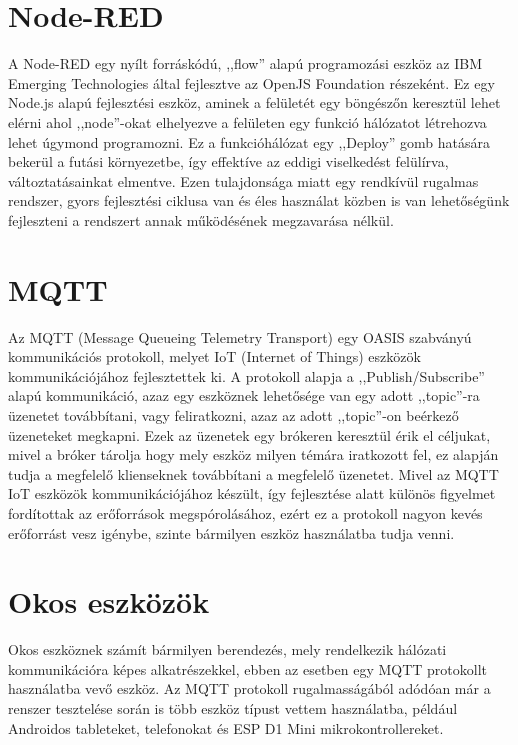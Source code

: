 \documentclass[
]{thesis-ekf}
\theoremstyle{definition}
\theoremstyle{remark}
\begin{document}
\section{Node-RED}
A Node-RED egy nyílt forráskódú, ,,flow'' alapú programozási eszköz az IBM Emerging Technologies\cite{ibmET} 
által fejlesztve az OpenJS Foundation\cite{openjs} részeként. Ez egy Node.js alapú fejlesztési eszköz, aminek a felületét egy 
böngészőn keresztül lehet elérni ahol ,,node''-okat elhelyezve a felületen  egy funkció hálózatot létrehozva lehet úgymond programozni. 
Ez a funkcióhálózat egy ,,Deploy'' gomb hatására bekerül a futási környezetbe, így effektíve az eddigi viselkedést felülírva, 
változtatásainkat elmentve. Ezen tulajdonsága miatt egy rendkívül rugalmas rendszer, gyors fejlesztési ciklusa van és éles használat
közben is van lehetőségünk fejleszteni a rendszert annak működésének megzavarása nélkül.

\section{MQTT}
Az MQTT (Message Queueing Telemetry Transport)\cite{mqtt} egy OASIS szabványú kommunikációs protokoll, 
melyet IoT (Internet of Things) eszközök kommunikációjához fejlesztettek ki. 
A protokoll alapja a ,,Publish/Subscribe'' alapú kommunikáció, azaz egy eszköznek lehetősége van egy adott ,,topic''-ra üzenetet továbbítani, 
vagy feliratkozni, azaz az adott ,,topic''-on beérkező üzeneteket megkapni. Ezek az üzenetek egy brókeren keresztül érik el céljukat, 
mivel a bróker tárolja hogy mely eszköz milyen témára iratkozott fel, ez alapján tudja a megfelelő klienseknek továbbítani a megfelelő üzenetet. 
Mivel az MQTT IoT eszközök kommunikációjához készült, így fejlesztése alatt különös figyelmet fordítottak az erőforrások megspórolásához, 
ezért ez a protokoll nagyon kevés erőforrást vesz igénybe, szinte bármilyen eszköz használatba tudja venni.

\section{Okos eszközök}
Okos eszköznek számít bármilyen berendezés, mely rendelkezik hálózati kommunikációra képes alkatrészekkel, 
ebben az esetben egy MQTT protokollt használatba vevő eszköz. Az MQTT protokoll rugalmasságából 
adódóan már a renszer tesztelése során is több eszköz típust 
vettem használatba, például Androidos tableteket, telefonokat és ESP D1 Mini mikrokontrollereket.
\end{document}
